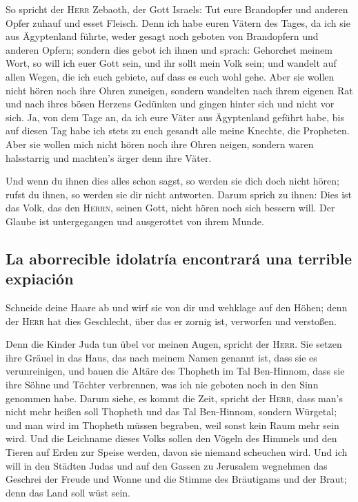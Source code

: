  So spricht der \textsc{Herr} Zebaoth, der Gott Israels:
Tut eure Brandopfer und anderen Opfer zuhauf und esset Fleisch.
 Denn ich habe euren Vätern des Tages, da ich sie aus
Ägyptenland führte, weder gesagt noch geboten von Brandopfern und
anderen Opfern;  sondern dies gebot ich ihnen und sprach:
Gehorchet meinem Wort, so will ich euer Gott sein, und ihr sollt mein
Volk sein; und wandelt auf allen Wegen, die ich euch gebiete, auf dass
es euch wohl gehe.  Aber sie wollen nicht hören noch ihre
Ohren zuneigen, sondern wandelten nach ihrem eigenen Rat und nach ihres
bösen Herzens Gedünken und gingen hinter sich und nicht vor sich.
 Ja, von dem Tage an, da ich eure Väter aus Ägyptenland
geführt habe, bis auf diesen Tag habe ich stets zu euch gesandt alle
meine Knechte, die Propheten.  Aber sie wollen mich nicht
hören noch ihre Ohren neigen, sondern waren halsstarrig und machten's
ärger denn ihre Väter.

 Und wenn du ihnen dies alles schon sagst, so werden sie
dich doch nicht hören; rufst du ihnen, so werden sie dir nicht
antworten.  Darum sprich zu ihnen: Dies ist das Volk, das
den \textsc{Herrn}, seinen Gott, nicht hören noch sich bessern will. Der
Glaube ist untergegangen und ausgerottet von ihrem Munde.

\hypertarget{la-aborrecible-idolatruxeda-encontraruxe1-una-terrible-expiaciuxf3n}{%
\subsection{La aborrecible idolatría encontrará una terrible
expiación}\label{la-aborrecible-idolatruxeda-encontraruxe1-una-terrible-expiaciuxf3n}}

 Schneide deine Haare ab und wirf sie von dir und
wehklage auf den Höhen; denn der \textsc{Herr} hat dies Geschlecht, über
das er zornig ist, verworfen und verstoßen.

 Denn die Kinder Juda tun übel vor meinen Augen, spricht
der \textsc{Herr}. Sie setzen ihre Gräuel in das Haus, das nach meinem
Namen genannt ist, dass sie es verunreinigen,  und bauen
die Altäre des Thopheth im Tal Ben-Hinnom, dass sie ihre Söhne und
Töchter verbrennen, was ich nie geboten noch in den Sinn genommen habe.
 Darum siehe, es kommt die Zeit, spricht der
\textsc{Herr}, dass man's nicht mehr heißen soll Thopheth und das Tal
Ben-Hinnom, sondern Würgetal; und man wird im Thopheth müssen begraben,
weil sonst kein Raum mehr sein wird.  Und die Leichname
dieses Volks sollen den Vögeln des Himmels und den Tieren auf Erden zur
Speise werden, davon sie niemand scheuchen wird.  Und ich
will in den Städten Judas und auf den Gassen zu Jerusalem wegnehmen das
Geschrei der Freude und Wonne und die Stimme des Bräutigams und der
Braut; denn das Land soll wüst sein.

